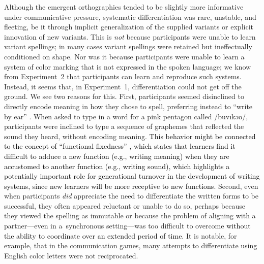 \documentclass[doc,biblatex]{apa7}
\newcommand\firstrevision[1]{\textcolor{black}{#1}}
\begin{document}
Although the emergent orthographies tended to be slightly more informative under communicative pressure, systematic differentiation was rare, unstable, and fleeting, be it through implicit generalization of the supplied variants or explicit innovation of new variants. This is \textit{not} because participants were unable to learn variant spellings; in many cases variant spellings were retained but ineffectually conditioned on shape. Nor was it because participants were unable to learn a system of color marking that is not expressed in the spoken language; we know from Experiment~2 that participants can learn and reproduce such systems. Instead, it seems that, in Experiment~1, differentiation could not get off the ground. We see two reasons for this. First, participants seemed disinclined to directly encode meaning in how they chose to spell, preferring instead to ``write by ear'' \parencite{Frith:1979}. When asked to type in a word for a pink pentagon called /buvɪkəʊ/, participants were inclined to type a sequence of graphemes that reflected the sound they heard, without encoding meaning. \firstrevision{This behavior might be connected to the concept of ``functional fixedness'' \parencite{German:2000}, which states that learners find it difficult to adduce a new function (e.g., writing meaning) when they are accustomed to another function (e.g., writing sound), which highlights a potentially important role for generational turnover in the development of writing systems, since new learners will be more receptive to new functions.} Second, even when participants \textit{did} appreciate the need to differentiate the written forms to be successful, they often appeared reluctant or unable to do so, perhaps because they viewed the spelling as immutable or because the problem of aligning with a partner---even in a~synchronous setting---was too difficult to overcome \firstrevision{without the ability to coordinate over an extended period of time}. It is notable, for example, that in the communication games, many attempts to differentiate using English color letters were not reciprocated.
\end{document}
